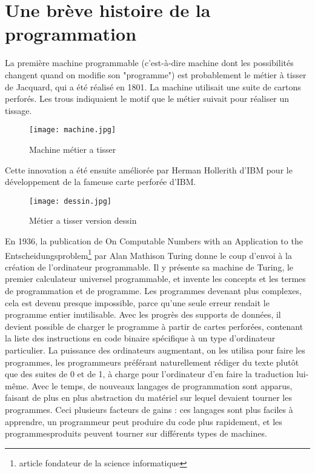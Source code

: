 \documentclass[12pt,a4paper]{article}
\begin{document}
\section{\label{histoire}Une brève histoire de la programmation}
La première machine programmable (c’est-à-dire machine dont les
possibilités changent quand on modifie son "programme") est
probablement le métier à tisser de Jacquard, qui a été réalisé en
1801. La machine utilisait une suite de cartons perforés. Les trous
indiquaient le motif que le métier suivait pour réaliser un
tissage.\\
\begin{figure}[!h]
 \centering
  \texttt{[image: machine.jpg]}
  \caption{Machine métier a tisser}
  \label{fig:Métier a tisser}
\end{figure}
\newpage
Cette innovation a été ensuite améliorée par Herman Hollerith d'IBM
pour le développement de la fameuse carte perforée d'IBM.\\
\begin{figure}[ht]
 \centering
  \texttt{[image: dessin.jpg]}
  \caption{Métier a tisser version dessin}
  \label{fig:Métier a tisser version dessin}
\end{figure}

En 1936, la publication de On Computable Numbers with an Application
to the Entscheidungsproblem\cite{livre2}\footnote{article fondateur de la 
science informatique} par Alan Mathison Turing donne le coup  d'envoi à la 
création de l'ordinateur programmable. Il y présente sa machine de 
Turing, le premier calculateur universel programmable, et invente les
concepts et les termes de programmation et de programme.
Les programmes devenant plus complexes, cela est devenu presque 
impossible, parce qu'une seule erreur rendait le programme entier 
inutilisable. Avec les progrès des supports de données, il devient 
possible de charger le programme à partir de cartes perforées, 
contenant la liste des instructions en code binaire spécifique à un 
type d'ordinateur particulier. La puissance des ordinateurs
augmentant, on les utilisa pour faire les programmes, les programmeurs préférant
naturellement rédiger du texte plutôt que des suites de 0 et de 1, à 
charge pour l'ordinateur d'en faire la traduction lui-même. Avec le 
temps, de nouveaux langages de programmation sont apparus, faisant de
plus en plus abstraction du matériel sur lequel devaient tourner les 
programmes. Ceci plusieurs facteurs de gains : ces langages sont plus
faciles à apprendre, un programmeur peut produire du code plus 
rapidement, et les programmesproduits peuvent tourner sur différents 
types de machines.
\end{document}
